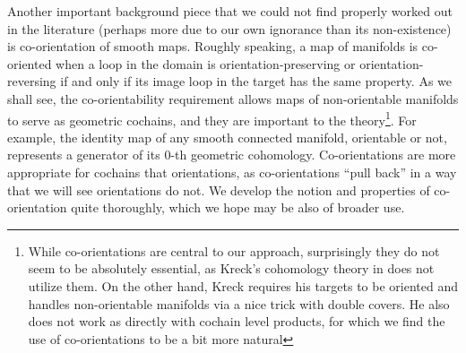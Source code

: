 Another important background piece that we could not find properly worked out in the literature (perhaps more due to our own ignorance than its non-existence) is co-orientation of smooth maps.
Roughly speaking, a map of manifolds is co-oriented when a loop in the domain is orientation-preserving or orientation-reversing if and only if its image loop in the target has the same property.
As we shall see, the co-orientability requirement allows maps of non-orientable manifolds to serve as geometric cochains, and they are important to the theory\footnote{While co-orientations are central to our approach, surprisingly they do not seem to be absolutely essential, as Kreck's cohomology theory in \cite{Krec10} does not utilize them.
On the other hand, Kreck requires his targets to be oriented and handles non-orientable manifolds via a nice trick with double covers.
He also does not work as directly with cochain level products, for which we find the use of co-orientations to be a bit more natural}.
For example, the identity map of any smooth connected manifold, orientable or not, represents a generator of its $0$-th geometric cohomology.
Co-orientations are more appropriate for cochains that orientations, as co-orientations ``pull back'' in a way that we will see orientations do not.
We develop the notion and properties of co-orientation quite thoroughly, which we hope may be also of broader use.